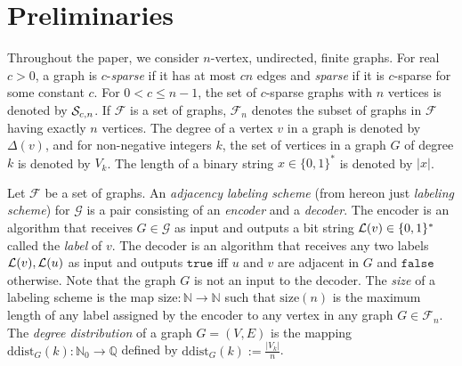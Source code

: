 
\section{Preliminaries}
Throughout the paper, we consider $n$-vertex, undirected, finite graphs.
For real $c > 0$, a graph is $c$-\emph{sparse} if it has at most $cn$ edges and \emph{sparse} if it is $c$-sparse for some constant $c$. For $0 < c \leq n-1$, the set of $c$-sparse graphs with $n$ vertices is denoted by $ \mathcal{S}_{c,n}$.
If $\mathcal{F}$ is a set of graphs,  $\mathcal{F}_n$ denotes the subset of graphs in $\mathcal{F}$ having exactly $n$
vertices. The degree of a vertex $v$ in a graph is denoted by $\Delta(v)$, and for non-negative integers $k$,
the set of vertices in a graph $G$ of degree $k$  is denoted by $V_k$.
The length of a binary string $x \in \{ 0,1 \}^*$ is denoted by $\vert x \vert$.

Let  $\mathcal{F}$ be a set of graphs. An  \emph{adjacency labeling scheme} (from hereon just \emph{labeling scheme}) for  $\mathcal{G}$
is a pair consisting of an \emph{encoder} and a \emph{decoder}. The encoder is an algorithm that receives $G \in \mathcal{G}$ as input and outputs a bit string $ \mathcal{L}(v) \in \{0,1\}^*$ called the \emph{label} of $v$. The decoder 
is an algorithm that receives any two labels $ \mathcal{L}(v), \mathcal{L}(u)$ as input and outputs $\mathtt{true}$ if{f} $u$ and $v$
are adjacent in $G$ and $\mathtt{false}$ otherwise. Note that the graph $G$ is not an input to the decoder.
The \emph{size} of a labeling scheme is the map $\textrm{size} : \mathbb{N} \longrightarrow \mathbb{N}$
such that $\textrm{size}(n)$ is the maximum length of any label assigned by the encoder to any vertex in
any graph $G \in \mathcal{F}_n$. The \emph{degree distribution} of a graph $G = (V,E)$ is the mapping
 $\mathrm{ddist}_G (k) : \mathbb{N}_0 \longrightarrow \mathbb{Q}$
defined by $\mathrm{ddist}_G (k) := \frac{\vert V_k \vert} {n}$.




